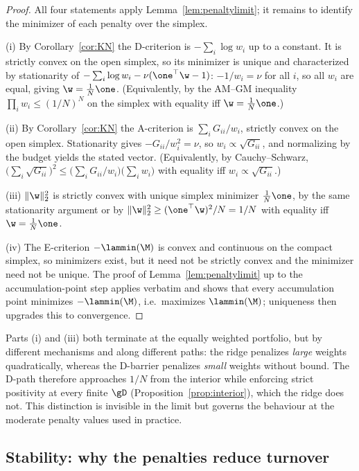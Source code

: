 \begin{proof}
All four statements apply Lemma~\ref{lem:penaltylimit}; it remains to identify the
minimizer of each penalty over the simplex.

(i) By Corollary~\ref{cor:KN} the D-criterion is $-\sum_i\log w_i$ up to a
constant. It is strictly convex on the open simplex, so its minimizer is unique
and characterized by stationarity of
$-\sum_i\log w_i-\nu(\one^\top\w-1)$: $-1/w_i=\nu$ for all $i$, so all $w_i$ are
equal, giving $\w=\tfrac1N\one$. (Equivalently, by the AM--GM inequality
$\prod_iw_i\le(1/N)^N$ on the simplex with equality iff $\w=\tfrac1N\one$.)

(ii) By Corollary~\ref{cor:KN} the A-criterion is $\sum_iG_{ii}/w_i$, strictly
convex on the open simplex. Stationarity gives $-G_{ii}/w_i^2=\nu$, so
$w_i\propto\sqrt{G_{ii}}$, and normalizing by the budget yields the stated
vector. (Equivalently, by Cauchy--Schwarz,
$\big(\sum_i\sqrt{G_{ii}}\big)^2\le\big(\sum_iG_{ii}/w_i\big)\big(\sum_iw_i\big)$
with equality iff $w_i\propto\sqrt{G_{ii}}$.)

(iii) $\lVert\w\rVert_2^2$ is strictly convex with unique simplex minimizer
$\tfrac1N\one$, by the same stationarity argument or by
$\lVert\w\rVert_2^2\ge(\one^\top\w)^2/N=1/N$ with equality iff $\w=\tfrac1N\one$.

(iv) The E-criterion $-\lammin(\M)$ is convex and continuous on the compact
simplex, so minimizers exist, but it need not be strictly convex and the
minimizer need not be unique. The proof of Lemma~\ref{lem:penaltylimit} up to the
accumulation-point step applies verbatim and shows that every accumulation point
minimizes $-\lammin(\M)$, i.e.\ maximizes $\lammin(\M)$; uniqueness then upgrades
this to convergence.
\end{proof}

\begin{remark}
Parts (i) and (iii) both terminate at the equally weighted portfolio, but by
different mechanisms and along different paths: the ridge penalizes \emph{large}
weights quadratically, whereas the D-barrier penalizes \emph{small} weights
without bound. The D-path therefore approaches $1/N$ from the interior while
enforcing strict positivity at every finite $\gD$ (Proposition~\ref{prop:interior}),
which the ridge does not. This distinction is invisible in the limit but governs
the behaviour at the moderate penalty values used in practice.
\end{remark}

\subsection{Stability: why the penalties reduce turnover}

